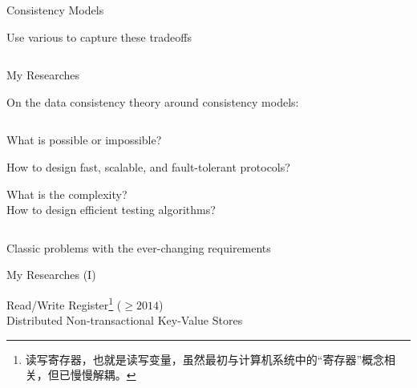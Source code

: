 \begin{frame}{Consistency Models}
	\begin{center}
		Use various  to capture these tradeoffs
	\end{center}

	\begin{columns}[c]
		\begin{center}
		\end{center}
		\begin{center}
		\end{center}
	\end{columns}

\end{frame}

\begin{frame}{My Researches}
	\begin{center}
		On the data consistency theory around consistency models:
	\end{center}

	\begin{columns}
		\begin{description}[Computability]
			\setlength{\itemsep}{8pt}
			\item[Computability:] What is possible or impossible?
			\item[Protocol:] How to design fast, scalable, and fault-tolerant protocols?
			\item[Testing:] What is the complexity? \\[3pt] How to design efficient testing algorithms?
		\end{description}
	\end{columns}

	\pause
	\vspace{0.50cm}
	\begin{center}
		Classic problems with the ever-changing requirements
	\end{center}
\end{frame}

\begin{frame}{My Researches (I)}
	\begin{center}
		Read/Write Register\footnote{读写寄存器，也就是读写变量，虽然最初与计算机系统中的``寄存器''概念相关，但已慢慢解耦。} ($\ge 2014$) \\[6pt]

		Distributed Non-transactional Key-Value Stores
	\end{center}
\end{frame}

